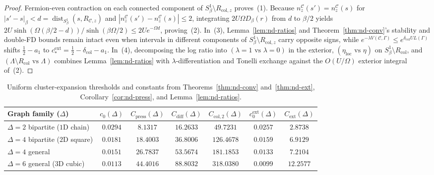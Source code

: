 \documentclass[11pt]{article}
\theoremstyle{definition}
\theoremstyle{remark}
\begin{document}
\begin{proof}
Fermion-even contraction on each connected component of $S^1_\beta \setminus R_{\mathrm{col},z}$
proves~(1). Because $n_z^{\mathcal{C}}(s') = n_z^{\mathcal{C}}(s)$ for
$|s'-s|_\beta < d = \operatorname{dist}_{S^1_\beta}(s, R_{\mathcal{C},z})$ and
$|n_z^{\mathcal{C}}(s') - n_z^{\mathcal{C}}(s)| \le 2$, integrating $2U\Omega D_\beta(r)$
from $d$ to $\beta/2$ yields $2U\sinh(\Omega(\beta/2-d))/\sinh(\beta\Omega/2) \le 2U e^{-\Omega d}$,
proving~(2). In~(3), Lemma~\ref{lem:nd-ratios} and Theorem~\ref{thm:nd-conv}'s
stability and double-FD bounds remain intact even when intervals in different
components of $S^1_\beta \setminus R_{\mathrm{col},z}$ carry opposite signs,
while $e^{-\lambda V(\mathcal{C},\Gamma)} \le e^{\delta_{\mathrm{col}} U L(\Gamma)}$
shifts $\frac{1}{2} - a_1$ to $c_*^{\mathrm{ext}} = \frac{1}{2} - \delta_{\mathrm{col}} - a_1$.
In~(4), decomposing the log ratio into $(\lambda=1 \text{ vs } \lambda=0)$ in
the exterior, $(\eta_{\mathrm{loc}} \text{ vs } \eta)$ on $S^1_\beta \setminus R_{\mathrm{col}}$,
and $(\Lambda \setminus R_{\mathrm{col}} \text{ vs } \Lambda)$ combines Lemma~\ref{lem:nd-ratios}
with $\lambda$-differentiation and Tonelli exchange against the $O(U/\Omega)$
exterior integral of~(2).
\end{proof}

\begin{table}[t]
\centering
\caption{Uniform cluster-expansion thresholds and constants from Theorems~\ref{thm:nd-conv} and~\ref{thm:nd-ext}, Corollary~\ref{cor:nd-press}, and Lemma~\ref{lem:nd-ratios}.}
\label{tab:nd-constants}
\small
\begin{tabular}{@{}lcccccc@{}}
\toprule
Graph family ($\Delta$) & $c_0(\Delta)$ & $C_{\mathrm{press}}(\Delta)$ & $C_{\mathrm{diff}}(\Delta)$ & $C_{\mathrm{col},2}(\Delta)$ & $c_0^{\mathrm{ext}}(\Delta)$ & $C_{\mathrm{ext}}(\Delta)$ \\
\midrule
$\Delta = 2$ bipartite ($1$D chain) & $0.0294$ & $8.1317$ & $16.2633$ & $49.7231$ & $0.0257$ & $2.8738$ \\
$\Delta = 4$ bipartite ($2$D square) & $0.0181$ & $18.4003$ & $36.8006$ & $126.4678$ & $0.0159$ & $6.9129$ \\
$\Delta = 4$ general & $0.0151$ & $26.7837$ & $53.5674$ & $181.1853$ & $0.0133$ & $7.2104$ \\
$\Delta = 6$ general ($3$D cubic) & $0.0113$ & $44.4016$ & $88.8032$ & $318.0380$ & $0.0099$ & $12.2577$ \\
\bottomrule
\end{tabular}
\end{table}
\end{document}

